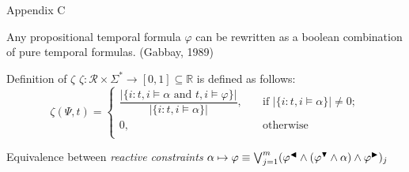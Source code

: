 \documentclass[10pt]{beamer}
\begin{document}
\begin{frame}{Appendix C}
\begin{theorem}
Any propositional temporal formula $\varphi$ can be rewritten as a boolean combination of pure temporal formulas. (Gabbay, 1989)
\end{theorem}

\begin{block}{Definition of $\zeta$}
$\zeta: \mathcal{R} \times \Sigma^* \rightarrow [0,1] \subseteq \mathbb{R}$ is defined as follows:
\[   
\zeta(\Psi,t) = 
     \begin{cases}
       \dfrac{\lvert \{ i: t,i \models \alpha \text{ and } t,i \models \varphi\} \rvert}{\lvert \{ i: t,i \models \alpha\} \rvert}, &\quad\text{if } \lvert \{ i: t,i \models \alpha\} \rvert \neq 0 ;\\
       0, &\quad\text{otherwise} \\
     \end{cases}
\]
\end{block}

\begin{block}{Equivalence between \textit{reactive constraints}}
$\alpha \mapsto \varphi \equiv \bigvee\nolimits^{m}_{j=1} (\varphi^{\blacktriangleleft} \wedge (\varphi^{\blacktriangledown} \wedge \alpha) \wedge \varphi^{\blacktriangleright})_j$
\end{block}
\end{frame}
\end{document}

